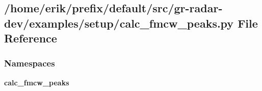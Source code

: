 \subsection{/home/erik/prefix/default/src/gr-\/radar-\/dev/examples/setup/calc\+\_\+fmcw\+\_\+peaks.py File Reference}
\label{calc__fmcw__peaks_8py}
\subsubsection*{Namespaces}
\begin{DoxyCompactItemize}
\item 
 {\bf calc\+\_\+fmcw\+\_\+peaks}
\end{DoxyCompactItemize}
